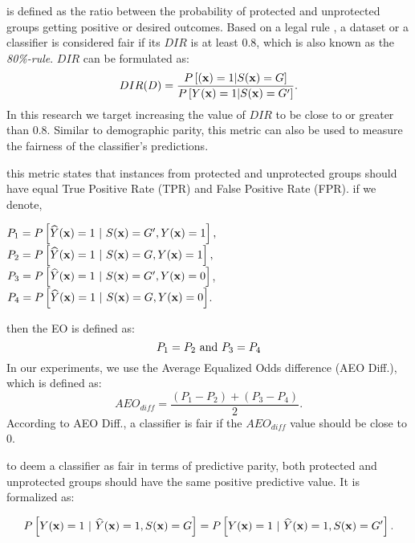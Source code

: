 is defined as the ratio between the probability of protected and unprotected groups getting positive or desired outcomes. Based on a legal rule \cite{US_guideline}, a dataset or a classifier is considered fair if its $DIR$ is at least 0.8, which is also known as the \emph{80\%-rule}. $DIR$ can be formulated as:
\begin{equation}\label{eq:di}
DIR(D) = \frac{ P\left[({\bf x}) = 1 | S({\bf x}) = G\right]} {P\left[Y({\bf x}) = 1 | S({\bf x})=G'\right]}.
\end{equation}
In this research we target increasing the value of $DIR$ to be close to or greater than $0.8$. Similar to demographic parity, this metric can also be used to measure the fairness of the classifier's predictions.


 this metric states that instances from protected and unprotected groups should have equal True Positive Rate (TPR) and False Positive Rate (FPR). 
if we denote, \\
\begin{center}
$P_1 = P\left[ \widehat{Y}({\bf x})=1\ |\ S({\bf x})=G', Y ({\bf x})=1 \right],$\\ 
$P_2 = P\left[ \widehat{Y}({\bf x})=1\ |\ S({\bf x})=G, Y({\bf x})=1 \right],$\\  
$P_3 = P\left[ \widehat{Y}({\bf x})=1\ |\ S({\bf x})=G', Y({\bf x})=0 \right]$, \\
$P_4 = P\left[ \widehat{Y}({\bf x})=1\ |\ S({\bf x})=G, Y({\bf x})=0 \right]$.\\
\end{center}
then the EO is defined as:
\begin{equation}\label{eq:eo}
P_1 = P_2\ \text{and}\ P_3 = P_4 \\
\end{equation}
In our experiments, we use the Average Equalized Odds difference (AEO Diff.), which is defined as:
\[
AEO_{diff} = \frac{(P_1 - P_2)+(P_3 - P_4)}{2}. 
\]
According to AEO Diff., a classifier is fair if the $AEO_{diff}$ value should be close to $0$.



 to deem a classifier as fair in terms of predictive parity, both protected and unprotected groups should have the same positive predictive value. It is formalized as:\\
\begin{small}
\[
P\left[Y({\bf x}) = 1\ |\ \widehat{Y}({\bf x})=1, S({\bf x})=G\right] = P\left[Y({\bf x}) = 1\ |\ \widehat{Y}({\bf x})=1, S({\bf x})=G'\right].
\]
\end{small}


